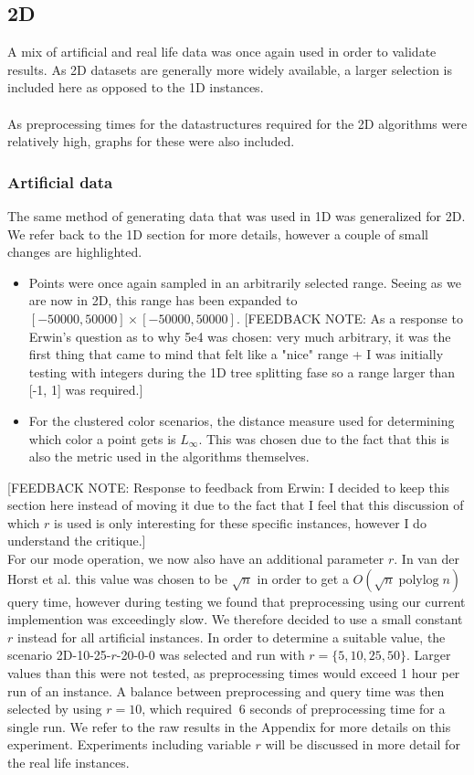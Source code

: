 \documentclass{article}
\newcommand{\fb}[1]{{\color{blue}#1}}
\newcommand{\fbnote}[1]{{\color{blue}[FEEDBACK NOTE: #1]\\}}
\DeclareMathOperator{\polylog}{polylog}
\begin{document}
\subsection{2D}
A mix of artificial and real life data was once again used in order to validate
results. As 2D datasets are generally more widely available, a larger selection
is included here as opposed to the 1D instances. \\\\ As preprocessing times
for the datastructures required for the 2D algorithms were relatively high,
graphs for these were also included. \subsubsection*{Artificial data} The same
method of generating data that was used in 1D was generalized for 2D. We refer
back to the 1D section for more details, however a couple of small changes are
highlighted.
\begin{itemize}
    \item Points were once again sampled in an arbitrarily selected range. Seeing as we
          are now in 2D, this range has been expanded to $[-50000, 50000] \times [-50000,
                  50000]$. \fbnote{As a response to Erwin's question as to why 5e4 was chosen: very much arbitrary, it was the first thing that came to mind that felt like a "nice" range + I was initially testing with integers during the 1D tree splitting fase so a range larger than [-1, 1] was required.}
    \item For the clustered color scenarios, the distance measure used for determining
          which color a point gets is $L_\infty$. This was chosen due to the fact that
          this is also the metric used in the algorithms themselves.
\end{itemize}
\fbnote{Response to feedback from Erwin: I decided to keep this section here instead of moving it due to the fact that I feel that this discussion of which $r$ is used is only interesting for these specific instances, however I do understand the critique.}
\fb{For our mode operation, we now also have an additional parameter $r$. In van der Horst et al. this value was chosen to be $\sqrt{n}$ in order to get a $O(\sqrt{n} \polylog n)$ query time, however during testing we found that preprocessing using our current implemention was exceedingly slow. We therefore decided to use a small constant $r$ instead for all artificial instances. In order to determine a suitable value, the scenario 2D-10-25-$r$-20-0-0 was selected and run with $r=\{ 5, 10, 25, 50 \}$. Larger values than this were not tested, as preprocessing times would exceed 1 hour per run of an instance. A balance between preprocessing and query time was then selected by using $r=10$, which required $~6$ seconds of preprocessing time for a single run. We refer to the raw results in the Appendix for more details on this experiment. Experiments including variable $r$ will be discussed in more detail for the real life instances.} \\\\
\end{document}
